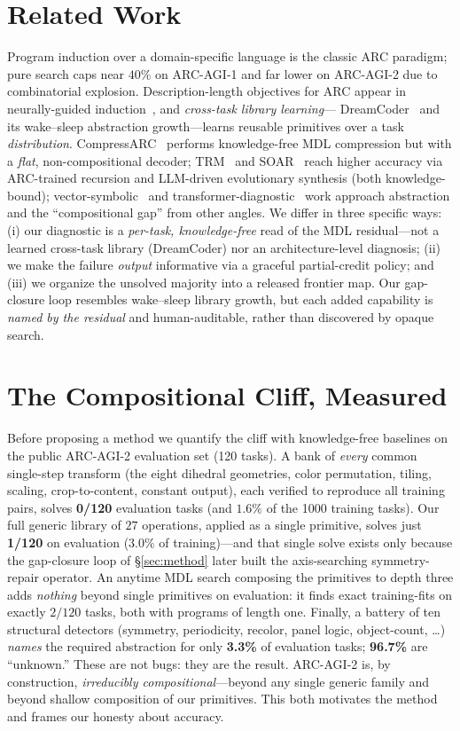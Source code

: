 \documentclass[11pt]{article}
\begin{document}
\section{Related Work}\label{sec:related}
Program induction over a domain-specific language is the classic ARC paradigm; pure search caps near $40\%$ on
ARC-AGI-1 and far lower on ARC-AGI-2 due to combinatorial explosion. Description-length objectives for ARC
appear in neurally-guided induction~\cite{ouellette2024neurally}, and \emph{cross-task library learning}---
DreamCoder~\cite{ellis2021dreamcoder} and its wake--sleep abstraction growth---learns reusable primitives over
a task \emph{distribution}. CompressARC~\cite{liao2025compressarc} performs knowledge-free MDL compression but
with a \emph{flat}, non-compositional decoder; TRM~\cite{jolicoeur2025trm} and SOAR~\cite{pourcel2025soar}
reach higher accuracy via ARC-trained recursion and LLM-driven evolutionary synthesis (both knowledge-bound);
vector-symbolic~\cite{vsa2025arc} and transformer-diagnostic~\cite{affinity2025compgap} work approach
abstraction and the ``compositional gap'' from other angles. We differ in three specific ways: (i) our
diagnostic is a \emph{per-task, knowledge-free} read of the MDL residual---not a learned cross-task library
(DreamCoder) nor an architecture-level diagnosis; (ii) we make the failure \emph{output} informative via a
graceful partial-credit policy; and (iii) we organize the unsolved majority into a released frontier map. Our
gap-closure loop resembles wake--sleep library growth, but each added capability is \emph{named by the
residual} and human-auditable, rather than discovered by opaque search.

\section{The Compositional Cliff, Measured}\label{sec:cliff}
Before proposing a method we quantify the cliff with knowledge-free baselines on the public ARC-AGI-2
evaluation set (120 tasks). A bank of \emph{every} common single-step transform (the eight dihedral
geometries, color permutation, tiling, scaling, crop-to-content, constant output), each verified to reproduce
all training pairs, solves \textbf{0/120} evaluation tasks (and $1.6\%$ of the 1000 training tasks). Our full
generic library of $27$ operations, applied as a single primitive, solves just \textbf{1/120} on evaluation
($3.0\%$ of training)---and that single solve exists only because the gap-closure loop of \S\ref{sec:method}
later built the axis-searching symmetry-repair operator. An anytime MDL search composing the primitives to
depth three adds \emph{nothing} beyond single primitives on evaluation: it finds exact training-fits on
exactly $2/120$ tasks, both with programs of length one. Finally, a battery of ten
structural detectors (symmetry, periodicity, recolor, panel logic, object-count, \dots) \emph{names} the
required abstraction for only \textbf{3.3\%} of evaluation tasks; \textbf{96.7\%} are ``unknown.'' These are not
bugs: they are the result. ARC-AGI-2 is, by construction, \emph{irreducibly compositional}---beyond any single
generic family and beyond shallow composition of our primitives. This both motivates the method and frames our
honesty about accuracy.
\end{document}

